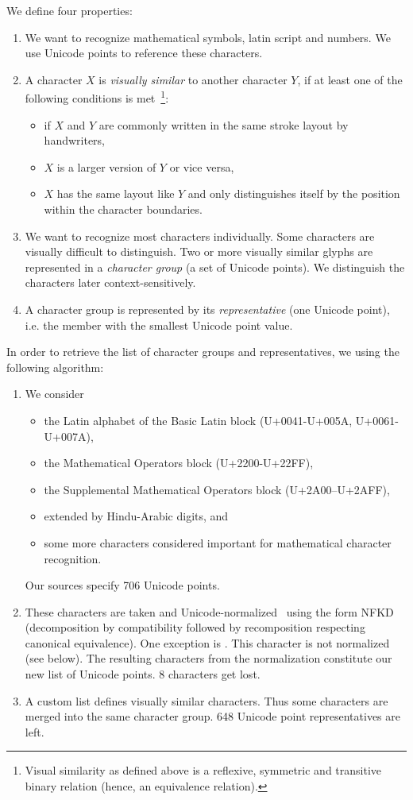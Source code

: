 We define four properties:
\begin{enumerate}
\item We want to recognize mathematical symbols, latin script and numbers.
  We use Unicode points to reference these characters.
\item A character $X$ is \emph{visually similar} to another character $Y$,
  if at least one of the following conditions is met~\footnote{
    Visual similarity as defined above is a reflexive, symmetric and transitive binary relation (hence, an equivalence relation).
  }:
  \begin{itemize}
    \item if $X$ and $Y$ are commonly written in the same stroke layout by handwriters,
    \item $X$ is a larger version of $Y$ or vice versa,
    \item $X$ has the same layout like $Y$ and only distinguishes itself by the position within the character boundaries.
  \end{itemize}
\item We want to recognize most characters individually.
  Some characters are visually difficult to distinguish.
  Two or more visually similar glyphs are represented in a \emph{character group} (a set of Unicode points).
  We distinguish the characters later context-sensitively.
\item A character group is represented by its \emph{representative} (one Unicode point),
  i.e. the member with the smallest Unicode point value.
\end{enumerate}

In order to retrieve the list of character groups and representatives,
we using the following algorithm:
%
\begin{enumerate}
\item
  We consider
  \begin{itemize}
  \item the Latin alphabet of the Basic Latin block (U+0041-U+005A, U+0061-U+007A),
  \item the Mathematical Operators block (U+2200-U+22FF),
  \item the Supplemental Mathematical Operators block (U+2A00–U+2AFF),
  \item extended by Hindu-Arabic digits, and
  \item some more characters considered important for mathematical character recognition.
  \end{itemize}
  Our sources specify 706 Unicode points.
\item
  These characters are taken and Unicode-normalized~\cite{unicode-norm} using the form NFKD
  (decomposition by compatibility followed by recomposition respecting canonical equivalence).
  One exception is . This character is not normalized (see below).
  The resulting characters from the normalization constitute our new list of Unicode points.
  8 characters get lost.
\item
  A custom list defines visually similar characters. Thus some characters are merged into
  the same character group. 648 Unicode point representatives are left.
\end{enumerate}

